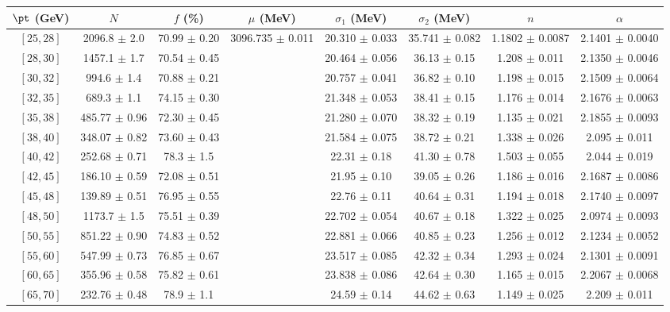 \begin{tabular}{c||c|c|c|c|c|c|c}
$\pt$ (GeV) & $N$ & $f$ (\%) & $\mu$ (MeV) & $\sigma_1$ (MeV) & $\sigma_2$ (MeV) & $n$ & $\alpha$ \\
\hline
$[25, 28]$ & 2096.8 $\pm$ 2.0 & 70.99 $\pm$ 0.20 & \multirow{19}{*}{3096.735 $\pm$ 0.011} & 20.310 $\pm$ 0.033 & 35.741 $\pm$ 0.082 & 1.1802 $\pm$ 0.0087 & 2.1401 $\pm$ 0.0040\\
$[28, 30]$ & 1457.1 $\pm$ 1.7 & 70.54 $\pm$ 0.45 &  & 20.464 $\pm$ 0.056 & 36.13 $\pm$ 0.15 & 1.208 $\pm$ 0.011 & 2.1350 $\pm$ 0.0046\\
$[30, 32]$ & 994.6 $\pm$ 1.4 & 70.88 $\pm$ 0.21 &  & 20.757 $\pm$ 0.041 & 36.82 $\pm$ 0.10 & 1.198 $\pm$ 0.015 & 2.1509 $\pm$ 0.0064\\
$[32, 35]$ & 689.3 $\pm$ 1.1 & 74.15 $\pm$ 0.30 &  & 21.348 $\pm$ 0.053 & 38.41 $\pm$ 0.15 & 1.176 $\pm$ 0.014 & 2.1676 $\pm$ 0.0063\\
$[35, 38]$ & 485.77 $\pm$ 0.96 & 72.30 $\pm$ 0.45 &  & 21.280 $\pm$ 0.070 & 38.32 $\pm$ 0.19 & 1.135 $\pm$ 0.021 & 2.1855 $\pm$ 0.0093\\
$[38, 40]$ & 348.07 $\pm$ 0.82 & 73.60 $\pm$ 0.43 &  & 21.584 $\pm$ 0.075 & 38.72 $\pm$ 0.21 & 1.338 $\pm$ 0.026 & 2.095 $\pm$ 0.011\\
$[40, 42]$ & 252.68 $\pm$ 0.71 & 78.3 $\pm$ 1.5 &  & 22.31 $\pm$ 0.18 & 41.30 $\pm$ 0.78 & 1.503 $\pm$ 0.055 & 2.044 $\pm$ 0.019\\
$[42, 45]$ & 186.10 $\pm$ 0.59 & 72.08 $\pm$ 0.51 &  & 21.95 $\pm$ 0.10 & 39.05 $\pm$ 0.26 & 1.186 $\pm$ 0.016 & 2.1687 $\pm$ 0.0086\\
$[45, 48]$ & 139.89 $\pm$ 0.51 & 76.95 $\pm$ 0.55 &  & 22.76 $\pm$ 0.11 & 40.64 $\pm$ 0.31 & 1.194 $\pm$ 0.018 & 2.1740 $\pm$ 0.0097\\
$[48, 50]$ & 1173.7 $\pm$ 1.5 & 75.51 $\pm$ 0.39 &  & 22.702 $\pm$ 0.054 & 40.67 $\pm$ 0.18 & 1.322 $\pm$ 0.025 & 2.0974 $\pm$ 0.0093\\
$[50, 55]$ & 851.22 $\pm$ 0.90 & 74.83 $\pm$ 0.52 &  & 22.881 $\pm$ 0.066 & 40.85 $\pm$ 0.23 & 1.256 $\pm$ 0.012 & 2.1234 $\pm$ 0.0052\\
$[55, 60]$ & 547.99 $\pm$ 0.73 & 76.85 $\pm$ 0.67 &  & 23.517 $\pm$ 0.085 & 42.32 $\pm$ 0.34 & 1.293 $\pm$ 0.024 & 2.1301 $\pm$ 0.0091\\
$[60, 65]$ & 355.96 $\pm$ 0.58 & 75.82 $\pm$ 0.61 &  & 23.838 $\pm$ 0.086 & 42.64 $\pm$ 0.30 & 1.165 $\pm$ 0.015 & 2.2067 $\pm$ 0.0068\\
$[65, 70]$ & 232.76 $\pm$ 0.48 & 78.9 $\pm$ 1.1 &  & 24.59 $\pm$ 0.14 & 44.62 $\pm$ 0.63 & 1.149 $\pm$ 0.025 & 2.209 $\pm$ 0.011\\

\end{tabular}
